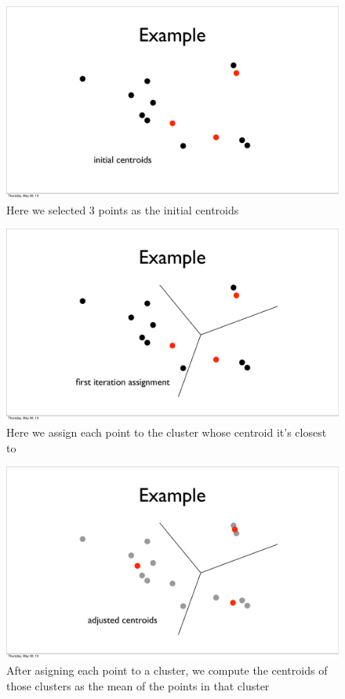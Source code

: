 \documentclass{article}
\begin{document}
\begin{figure}[H]
    \caption{Here we selected 3 points as the initial centroids}
    \includegraphics[scale=0.4]{kmeans-points-init.pdf}
\end{figure}

\begin{figure}[H]
    \caption{Here we assign each point to the cluster whose centroid it's
    closest to}
    \includegraphics[scale=0.4]{kmeans-points-assign1.pdf}
\end{figure}

\begin{figure}[H]
    \caption{After asigning each point to a cluster, we compute the centroids
    of those clusters as the mean of the points in that cluster}
    \includegraphics[scale=0.4]{kmeans-points-adjust1.pdf}
\end{figure}
\end{document}
